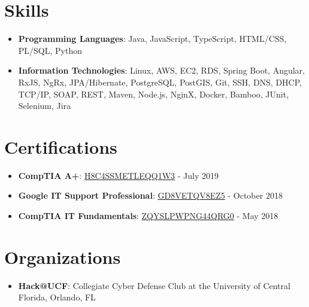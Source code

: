 \documentclass[letterpaper,11pt]{article}
\newcommand{\resumeItem}[2]{
  \item\small{
    \textbf{#1}{: #2 \vspace{-2pt}}
  }
}
\newcommand{\resumeSubItem}[2]{\resumeItem{#1}{#2}\vspace{-4pt}}
\newcommand{\resumeSubHeadingListStart}{\begin{itemize}[leftmargin=*]}
\newcommand{\resumeSubHeadingListEnd}{\end{itemize}}
\begin{document}
\section{Skills}
  \resumeSubHeadingListStart
    \resumeSubItem{Programming Languages}
      {Java, JavaScript, TypeScript, HTML/CSS, PL/SQL, Python}
    \resumeSubItem{Information Technologies}
      {Linux, AWS, EC2, RDS, Spring Boot, Angular, RxJS, NgRx, JPA/Hibernate, PostgreSQL, PostGIS, Git, SSH, DNS, DHCP, TCP/IP, SOAP, REST, Maven, Node.js, NginX, Docker, Bamboo, JUnit, Selenium, Jira}
  \resumeSubHeadingListEnd

\section{Certifications}
  \resumeSubHeadingListStart
    \resumeSubItem{CompTIA A+}
      {\href{https://www.certmetrics.com/comptia/public/verification.aspx?code=H8C4SSMETLEQQ1W3}{H8C4SSMETLEQQ1W3}} - {{July 2019}}
    \resumeSubItem{Google IT Support Professional}
      {\href{https://www.coursera.org/account/accomplishments/professional-cert/certificate/GD8VETQV8EZ5}{GD8VETQV8EZ5}} - {{October 2018}}
    \resumeSubItem{CompTIA IT Fundamentals}
      {\href{https://www.certmetrics.com/comptia/public/verification.aspx?code=ZQYSLPWPNG44QRG0}{ZQYSLPWPNG44QRG0}} - {{May 2018}}
  \resumeSubHeadingListEnd

\section{Organizations}
  \resumeSubHeadingListStart
    \resumeSubItem{Hack@UCF}
      {Collegiate Cyber Defense Club at the University of Central Florida, Orlando, FL}
  \resumeSubHeadingListEnd

\end{document}
